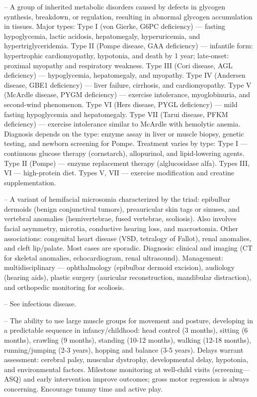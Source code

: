 -- A group of inherited metabolic disorders caused by defects in glycogen synthesis, breakdown, or regulation, resulting in abnormal glycogen accumulation in tissues. Major types: Type I (von Gierke, G6PC deficiency) — fasting hypoglycemia, lactic acidosis, hepatomegaly, hyperuricemia, and hypertriglyceridemia. Type II (Pompe disease, GAA deficiency) — infantile form: hypertrophic cardiomyopathy, hypotonia, and death by 1 year; late-onset: proximal myopathy and respiratory weakness. Type III (Cori disease, AGL deficiency) — hypoglycemia, hepatomegaly, and myopathy. Type IV (Andersen disease, GBE1 deficiency) — liver failure, cirrhosis, and cardiomyopathy. Type V (McArdle disease, PYGM deficiency) — exercise intolerance, myoglobinuria, and second-wind phenomenon. Type VI (Hers disease, PYGL deficiency) — mild fasting hypoglycemia and hepatomegaly. Type VII (Tarui disease, PFKM deficiency) — exercise intolerance similar to McArdle with hemolytic anemia. Diagnosis depends on the type: enzyme assay in liver or muscle biopsy, genetic testing, and newborn screening for Pompe. Treatment varies by type: Type I — continuous glucose therapy (cornstarch), allopurinol, and lipid-lowering agents. Type II (Pompe) — enzyme replacement therapy (alglucosidase alfa). Types III, VI — high-protein diet. Types V, VII — exercise modification and creatine supplementation.

-- A variant of hemifacial microsomia characterized by the triad: epibulbar dermoids (benign conjunctival tumors), preauricular skin tags or sinuses, and vertebral anomalies (hemivertebrae, fused vertebrae, scoliosis). Also involves facial asymmetry, microtia, conductive hearing loss, and macrostomia. Other associations: congenital heart disease (VSD, tetralogy of Fallot), renal anomalies, and cleft lip/palate. Most cases are sporadic. Diagnosis: clinical and imaging (CT for skeletal anomalies, echocardiogram, renal ultrasound). Management: multidisciplinary — ophthalmology (epibulbar dermoid excision), audiology (hearing aids), plastic surgery (auricular reconstruction, mandibular distraction), and orthopedic monitoring for scoliosis.



-- See infectious disease.

-- The ability to use large muscle groups for movement and posture, developing in a predictable sequence in infancy/childhood: head control (3 months), sitting (6 months), crawling (9 months), standing (10-12 months), walking (12-18 months), running/jumping (2-3 years), hopping and balance (3-5 years). Delays warrant assessment: cerebral palsy, muscular dystrophy, developmental delay, hypotonia, and environmental factors. Milestone monitoring at well-child visits (screening—ASQ) and early intervention improve outcomes; gross motor regression is always concerning. Encourage tummy time and active play.

